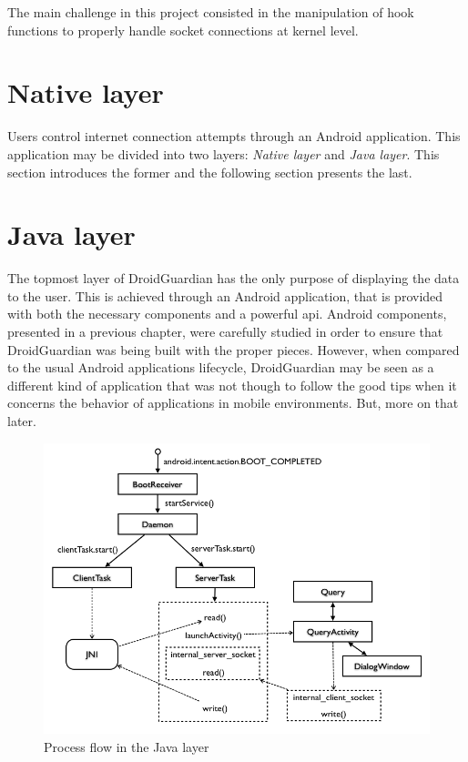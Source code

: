 The main challenge in this project consisted in the manipulation of hook functions to properly handle socket connections at kernel level.

\section{Native layer}

Users control internet connection attempts through an Android application. This application may be divided into two layers: \textit{Native layer} and \textit{Java layer}. This section introduces the former and the following section presents the last.


\section{Java layer}

The topmost layer of DroidGuardian has the only purpose of displaying the data to the user. This is achieved through an Android application, that is provided with both the necessary components and a powerful \gls{api}. Android components, presented in a previous chapter, were carefully studied in order to ensure that DroidGuardian was being built with the proper pieces. However, when compared to the usual Android applications lifecycle, DroidGuardian may be seen as a different kind of application that was not though to follow the good tips when it concerns the behavior of applications in mobile environments. But, more on that later.

\begin{figure}[h]
 \centering
 \includegraphics[scale=0.5]{figures/dg_java_flow.png}
 \caption{Process flow in the Java layer}
 \label{fig:dg_java_flow}
\end{figure}


